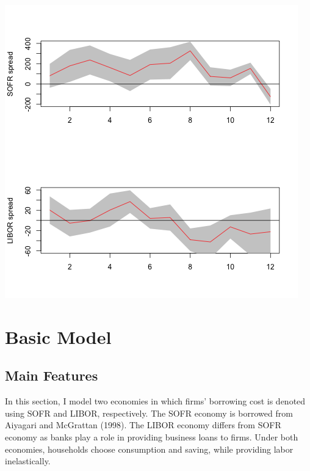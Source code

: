 \documentclass[12pt]{article}
\begin{document}
\begin{center}
  \includegraphics[scale=0.8]{../lp/results/irfs.png}
\end{center}

\newpage
\section{Basic Model}
\subsection{Main Features}
In this section, I model two economies in which firms' borrowing cost is denoted using
SOFR and LIBOR, respectively. The SOFR economy is borrowed from Aiyagari and McGrattan (1998).
The LIBOR economy differs from SOFR economy as banks play a role in providing business 
loans to firms. Under both economies, households choose consumption and saving, while 
providing labor inelastically.
\end{document}
